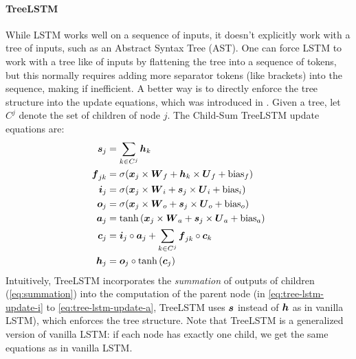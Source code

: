 \paragraph{TreeLSTM}
While LSTM works well on a sequence of inputs, it doesn't explicitly work with a
tree of inputs, such as an Abstract Syntax Tree (AST). One can force LSTM to work with a tree like of inputs by
flattening the tree into a sequence of tokens, but this normally requires adding
more separator tokens (like brackets) into the sequence, making if inefficient.
A better way is to directly enforce the tree structure into the update
equations, which was introduced in \cite{TreeLSTM}. Given a tree, let $C^j$
denote the set of children of node $j$. The Child-Sum TreeLSTM update equations
are:
\begin{align}
  \boldsymbol{s}_j &= \sum_{k\in C^j}{\boldsymbol{h}_k} \label{eq:summation}\\
  \boldsymbol{f}_{jk} &= \sigma(\boldsymbol{x}_j \times \boldsymbol{W}_f + \boldsymbol{h}_{k} \times \boldsymbol{U}_f + \text{bias}_f)\\
  \boldsymbol{i}_j &= \sigma(\boldsymbol{x}_j \times \boldsymbol{W}_i + \boldsymbol{s}_{j} \times \boldsymbol{U}_i + \text{bias}_i)\label{eq:tree-lstm-update-i}\\
  \boldsymbol{o}_j &= \sigma(\boldsymbol{x}_j \times \boldsymbol{W}_o + \boldsymbol{s}_{j} \times \boldsymbol{U}_o + \text{bias}_o)\label{eq:tree-lstm-update-o}\\
  \boldsymbol{a}_j &= \tanh{(\boldsymbol{x}_j \times \boldsymbol{W}_a + \boldsymbol{s}_{j} \times \boldsymbol{U}_a + \text{bias}_a)}\label{eq:tree-lstm-update-a}\\
  \boldsymbol{c}_j &= \boldsymbol{i}_j \circ \boldsymbol{a}_{j} + \sum_{k \in C^j}{\boldsymbol{f}_{jk} \circ \boldsymbol{c}_k} \\
  \boldsymbol{h}_j &= \boldsymbol{o}_j \circ \tanh{(\boldsymbol{c}_j)}
\end{align}
Intuitively, TreeLSTM incorporates the \emph{summation} of outputs of children
(\cref{eq:summation}) into the computation of the parent node
(in \cref{eq:tree-lstm-update-i} to \cref{eq:tree-lstm-update-a}, TreeLSTM uses
$\boldsymbol{s}$ instead of $\boldsymbol{h}$ as in vanilla LSTM), which enforces the tree structure.
Note that TreeLSTM is a generalized version of vanilla LSTM: if each node has exactly one child, we get the same equations as in
vanilla LSTM.
